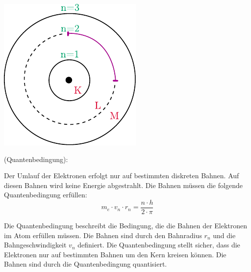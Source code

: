 \documentclass{tuftebook}
\begin{document}
    \begin{marginfigure}
        \centering
        \includegraphics[width=\linewidth]{figures/bohratomodell2.pdf}
        \caption{Grafische Darstellung der Quantenbedingung}
        \label{fig:quantenbedingung}
    \end{marginfigure}
    \begin{postulat}
        \vspace{-1em}
        (Quantenbedingung):
        \vspace{\baselineskip}

        \noindent Der Umlauf der Elektronen erfolgt nur auf bestimmten diskreten Bahnen. Auf diesen Bahnen wird keine Energie abgestrahlt. Die Bahnen müssen die folgende Quantenbedingung erfüllen: 
        \begin{equation}
            m_e\cdot v_n\cdot r_n=\frac{n\cdot h}{2\cdot\pi}
            \label{eq:quantenbedingung}
        \end{equation}
    \end{postulat}
    Die Quantenbedingung beschreibt die Bedingung, die die Bahnen der Elektronen im Atom erfüllen müssen. Die Bahnen sind durch den Bahnradius $r_n$ und die Bahngeschwindigkeit $v_n$ definiert. Die Quantenbedingung stellt sicher, dass die Elektronen nur auf bestimmten Bahnen um den Kern kreisen können. Die Bahnen sind durch die Quantenbedingung quantisiert.
\end{document}
